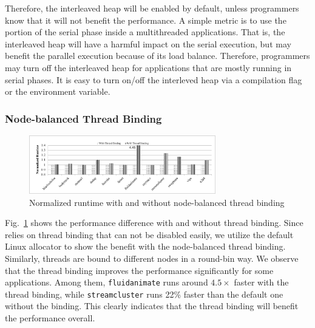 Therefore, the interleaved heap will be enabled by default, unless programmers know that it will not benefit the performance. A simple metric is to use the portion of the serial phase inside a multithreaded applications.  That is, the interleaved heap will have a harmful impact on the serial execution, but may benefit the parallel execution because of its load balance. Therefore, programmers may turn off the interleaved heap for applications that are mostly running in serial phases. It is easy to turn on/off the interleved heap via a compilation flag or the environment variable.  





\subsubsection{Node-balanced Thread Binding}
\label{sec: threadbinding}

\begin{figure}[!h]
    \centering
    \includegraphics[width=3.2in]{figure/WO-pthread-binding.pdf}
    \caption{Normalized runtime with and without node-balanced thread binding}
    \label{binding-pthread-scalibity}
\end{figure}

Fig.~\ref{binding-pthread-scalibity} shows the performance difference with and without thread binding. Since \NM{} relies on thread binding that can not be disabled easily, we utilize the default Linux allocator to show the benefit with the node-balanced thread binding. Similarly, threads are bound to different nodes in a round-bin way. We observe that the thread binding improves the performance significantly for some applications. Among them, \texttt{fluidanimate} runs around $4.5\times$ faster with the thread binding, while \texttt{streamcluster} runs 22\% faster than the default one without the binding. This clearly indicates that the thread binding will benefit the performance overall. 


